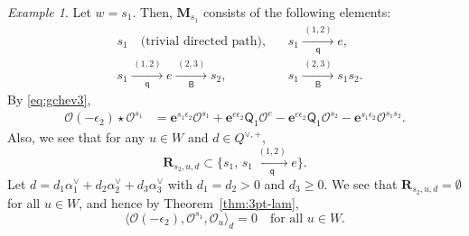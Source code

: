 \documentclass[11pt,a4paper,reqno,dvipdfmx]{amsart}
\numberwithin{equation}{section}
\newcommand{\CO}{\mathcal{O}}
\newcommand{\sQ}{\mathsf{Q}}
\newcommand{\eps}{\epsilon}
\newcommand{\be}{\mathbf{e}}
\newcommand{\bM}{\mathbf{M}}
\newcommand{\Qe}[1]{ \xrightarrow[\mathsf{q}]{\hspace{2pt}#1\hspace{2pt}} }
\newcommand{\Be}[1]{ \xrightarrow[\mathsf{B}]{\hspace{2pt}#1\hspace{2pt}} }
\newcommand{\bfR}{\mathbf{R}}
\theoremstyle{plain}
\theoremstyle{definition}
\theoremstyle{remark}
\newtheorem{ex}[lem]{Example}
\begin{document}
\iffalse
%
%
\begin{ex} \label{ex:a3-2}
Let $w = s_{1}$. Then, $\bM_{s_{1}}$ consists of the following elements:
%
\begin{align*}
& s_{1} \quad \text{(trivial directed path)}, & 
& s_{1} \Qe{(1,2)} e, \\
& s_{1} \Qe{(1,2)} e \Be{(2,3)} s_{2}, & 
& s_{1} \Be{(2,3)} s_{1}s_{2}. 
\end{align*}
%
By \eqref{eq:gchev3},
\begin{align*}
\CO(- \eps_{2}) \star \CO^{s_{1}} & = 
\be^{s_{1} \eps_{2} } \CO^{s_{1}} + 
\be^{ e \eps_{2} } \sQ_{1} \CO^{e} -
\be^{ e \eps_{2} } \sQ_{1} \CO^{s_{2}} -
\be^{ s_{1} \eps_{2} } \CO^{s_{1}s_{2}}. %
%
\end{align*}
%
Also, we see that for any $u \in W$ and $d \in Q^{\vee,+}$, 
%
\begin{equation*}
\bfR_{s_{2},u,d} \subset \bigl\{ s_{1}, \, s_{1} \Qe{(1,2)} e \bigr\}.
\end{equation*}
%
Let $d=d_{1}\alpha_{1}^{\vee} + d_{2}\alpha_{2}^{\vee} + d_{3}\alpha_{3}^{\vee}$ with 
$d_{1} = d_{2} > 0$ and $d_{3} \ge 0$. We see that $\bfR_{s_{2},u,d} = \emptyset$ for all $u \in W$, 
and hence by Theorem~\ref{thm:3pt-lam},
%
\begin{equation*}
\langle \CO(- \eps_{2}),\CO^{s_{1}},\CO_{u} \rangle_{d} = 0 \quad 
\text{for all $u \in W$}. 
\end{equation*}
%
\end{ex}
%
%
\end{document}
